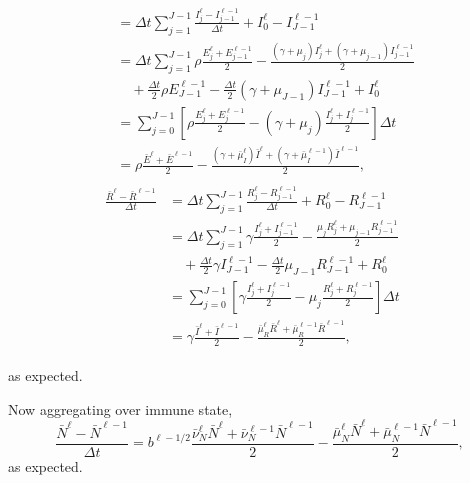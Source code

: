 \documentclass{jpmarticle}
\let\subequationsorig\subequations%
\let\endsubequationsorig\endsubequations%
\renewenvironment{subequations}{
  \subequationsorig
  \renewcommand{\theequation}{\theparentequation.\arabic{equation}}
}{
  \endsubequationsorig
}
\begin{document}
\begin{subequations}
\begin{align}
\begin{split}
      &= \Delta t \sum_{j = 1}^{J - 1}
      \frac{I_j^{\ell} - I_{j - 1}^{\ell - 1}}{\Delta t}
      + I_0^{\ell} - I_{J - 1}^{\ell - 1}
      \\
      &= \Delta t \sum_{j = 1}^{J - 1}
      \rho \frac{E_j^{\ell} + E_{j - 1}^{\ell - 1}}{2}
      - \frac{(\gamma + \mu_j) I_j^{\ell}
        + (\gamma + \mu_{j - 1}) I_{j - 1}^{\ell - 1}}{2}
      \\ & \quad {}
      + \frac{\Delta t}{2} \rho E_{J - 1}^{\ell - 1}
      - \frac{\Delta t}{2} (\gamma + \mu_{J - 1}) I_{J - 1}^{\ell - 1}
      + I_0^{\ell}
      \\
      &= \sum_{j = 0}^{J - 1} \left[
        \rho \frac{E_j^{\ell} + E_j^{\ell - 1}}{2}
        - (\gamma + \mu_j) \frac{I_j^{\ell} + I_j^{\ell - 1}}{2}
      \right] \Delta t
      \\
      &= \rho \frac{\bar{E}^{\ell} + \bar{E}^{\ell - 1}}{2}
      - \frac{(\gamma + \bar{\mu}_I^{\ell}) \bar{I}^{\ell}
        + (\gamma + \bar{\mu}_I^{\ell - 1}) \bar{I}^{\ell - 1}}{2},
    \end{split}
    \\
    \begin{split}
      \frac{\bar{R}^{\ell} - \bar{R}^{\ell - 1}}{\Delta t}
      &= \Delta t \sum_{j = 1}^{J - 1}
      \frac{R_j^{\ell} - R_{j - 1}^{\ell - 1}}{\Delta t}
      + R_0^{\ell} - R_{J - 1}^{\ell - 1}
      \\
      &= \Delta t \sum_{j = 1}^{J - 1}
      \gamma \frac{I_j^{\ell} + I_{j - 1}^{\ell - 1}}{2}
      - \frac{\mu_j R_j^{\ell} + \mu_{j - 1} R_{j - 1}^{\ell - 1}}{2}
      \\ & \quad {}
      + \frac{\Delta t}{2} \gamma I_{J - 1}^{\ell - 1}
      - \frac{\Delta t}{2} \mu_{J - 1} R_{J - 1}^{\ell - 1}
      + R_0^{\ell}
      \\
      &= \sum_{j = 0}^{J - 1} \left[
        \gamma \frac{I_j^{\ell} + I_j^{\ell - 1}}{2}
        - \mu_j \frac{R_j^{\ell} + R_j^{\ell - 1}}{2}
      \right] \Delta t
      \\
      &= \gamma \frac{\bar{I}^{\ell} + \bar{I}^{\ell - 1}}{2}
      - \frac{\bar{\mu}_R^{\ell} \bar{R}^{\ell}
        + \bar{\mu}_R^{\ell - 1} \bar{R}^{\ell - 1}}{2},
    \end{split}
  \end{align}
\end{subequations}
as expected.

Now aggregating over immune state,
\begin{equation}
  \frac{\bar{N}^{\ell} - \bar{N}^{\ell - 1}}{\Delta t}
  = b^{\ell - 1 / 2}
  \frac{\bar{\nu}_N^{\ell} \bar{N}^{\ell}
  + \bar{\nu}_N^{\ell - 1} \bar{N}^{\ell - 1}}{2}
  - \frac{\bar{\mu}_N^{\ell} \bar{N}^{\ell}
  + \bar{\mu}_N^{\ell - 1} \bar{N}^{\ell - 1}}{2},
\end{equation}
as expected.
\end{document}
